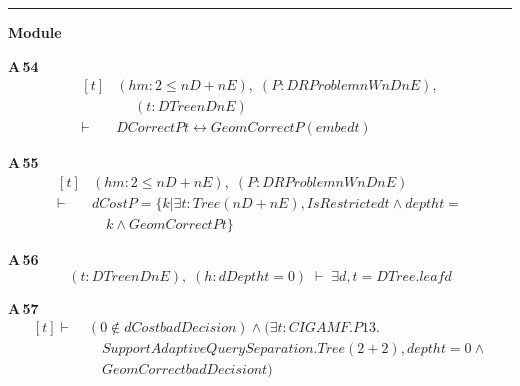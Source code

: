 \vspace{4pt}\noindent\rule{\columnwidth}{0.4pt}\par\vspace{2pt}
\noindent\textbf{Module }\par\vspace{3pt}

\noindent\textbf{A\,54}\quad{}
{\footnotesize\[ \begin{aligned}[t]
&(\mathit{hm} : 2 \leq \mathit{nD} + \mathit{nE}),\; (\mathit{P} : \mathit{DRProblem} \mathit{nW} \mathit{nD} \mathit{nE}),\\
&\quad \; (\mathit{t} : \mathit{DTree} \mathit{nD} \mathit{nE})\\
\vdash\;&\mathit{DCorrect} \mathit{P} \mathit{t} \leftrightarrow \mathit{GeomCorrect} \mathit{P} (\mathit{embed} \mathit{t})
\end{aligned} \]}

\noindent\textbf{A\,55}\quad{}
{\footnotesize\[ \begin{aligned}[t]
&(\mathit{hm} : 2 \leq \mathit{nD} + \mathit{nE}),\; (\mathit{P} : \mathit{DRProblem} \mathit{nW} \mathit{nD} \mathit{nE})\\
\vdash\;&\mathit{dCost} \mathit{P} = \{ \mathit{k} | \exists \mathit{t} : \mathit{Tree} (\mathit{nD} + \mathit{nE}), \mathit{IsRestricted} \mathit{t} \wedge \mathit{depth} \mathit{t} =\\
&\quad \mathit{k} \wedge \mathit{GeomCorrect} \mathit{P} \mathit{t}\}
\end{aligned} \]}

\noindent\textbf{A\,56}\quad{}
{\footnotesize\[ (\mathit{t} : \mathit{DTree} \mathit{nD} \mathit{nE}),\; (\mathit{h} : \mathit{dDepth} \mathit{t} = 0) \;\vdash\; \exists \mathit{d}, \mathit{t} = \mathit{DTree}.\mathit{leaf} \mathit{d} \]}

\noindent\textbf{A\,57}\quad{}
{\footnotesize\[ \begin{aligned}[t]
\vdash\;&(0 \notin \mathit{dCost} \mathit{badDecision}) \wedge (\exists \mathit{t} : \mathit{CIGAMF}.\mathit{P13}.\\
&\quad \mathit{SupportAdaptiveQuerySeparation}.\mathit{Tree} (2 + 2), \mathit{depth} \mathit{t} = 0 \wedge\\
&\quad \mathit{GeomCorrect} \mathit{badDecision} \mathit{t})
\end{aligned} \]}

